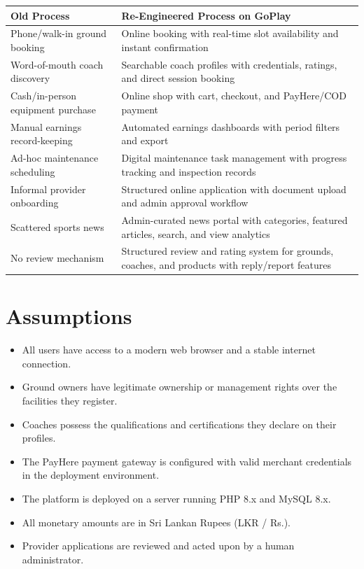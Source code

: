 \documentclass[12pt,a4paper]{report}
\begin{document}
\begin{center}
\begin{tabular}{p{5.5cm} p{8.5cm}}
\toprule
\textbf{Old Process} & \textbf{Re-Engineered Process on GoPlay}\\
\midrule
Phone/walk-in ground booking & Online booking with real-time slot availability and instant confirmation\\
Word-of-mouth coach discovery & Searchable coach profiles with credentials, ratings, and direct session booking\\
Cash/in-person equipment purchase & Online shop with cart, checkout, and PayHere/COD payment\\
Manual earnings record-keeping & Automated earnings dashboards with period filters and export\\
Ad-hoc maintenance scheduling & Digital maintenance task management with progress tracking and inspection records\\
Informal provider onboarding & Structured online application with document upload and admin approval workflow\\
Scattered sports news & Admin-curated news portal with categories, featured articles, search, and view analytics\\
No review mechanism & Structured review and rating system for grounds, coaches, and products with reply/report features\\
\bottomrule
\end{tabular}
\end{center}

\section{Assumptions}

\begin{itemize}[leftmargin=1.5cm]
  \item All users have access to a modern web browser and a stable internet connection.
  \item Ground owners have legitimate ownership or management rights over the facilities they register.
  \item Coaches possess the qualifications and certifications they declare on their profiles.
  \item The PayHere payment gateway is configured with valid merchant credentials in the deployment environment.
  \item The platform is deployed on a server running PHP 8.x and MySQL 8.x.
  \item All monetary amounts are in Sri Lankan Rupees (LKR / Rs.).
  \item Provider applications are reviewed and acted upon by a human administrator.
\end{itemize}
\end{document}
